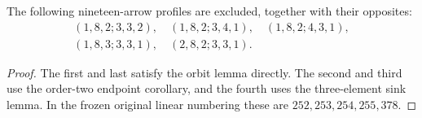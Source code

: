 \begin{corollary}
\label{CP2:A-linear19-five-small-extreme-large-profiles}
The following nineteen-arrow profiles are excluded, together
with their opposites:
\[
\begin{gathered}
 (1,8,2;3,3,2),\quad (1,8,2;3,4,1),\quad
 (1,8,2;4,3,1),\\
 (1,8,3;3,3,1),\quad (2,8,2;3,3,1).
\end{gathered}
\]
\end{corollary}
\begin{proof}
The first and last satisfy the orbit lemma directly. The
second and third use the order-two endpoint corollary, and
the fourth uses the three-element sink lemma. In the frozen
original linear numbering these are $252,253,254,255,378$.
\end{proof}

